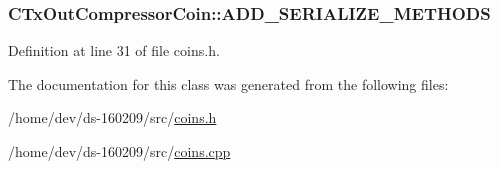 \subsubsection[{A\+D\+D\+\_\+\+S\+E\+R\+I\+A\+L\+I\+Z\+E\+\_\+\+M\+E\+T\+H\+O\+D\+S}]{\setlength{\rightskip}{0pt plus 5cm}C\+Tx\+Out\+Compressor\+Coin\+::\+A\+D\+D\+\_\+\+S\+E\+R\+I\+A\+L\+I\+Z\+E\+\_\+\+M\+E\+T\+H\+O\+D\+S}\label{class_c_tx_out_compressor_coin_ad61bf48ec0d5d0f53c3232b398f293c0}


Definition at line 31 of file coins.\+h.



The documentation for this class was generated from the following files\+:\begin{DoxyCompactItemize}
\item 
/home/dev/ds-\/160209/src/\hyperlink{coins_8h}{coins.\+h}\item 
/home/dev/ds-\/160209/src/\hyperlink{coins_8cpp}{coins.\+cpp}\end{DoxyCompactItemize}

